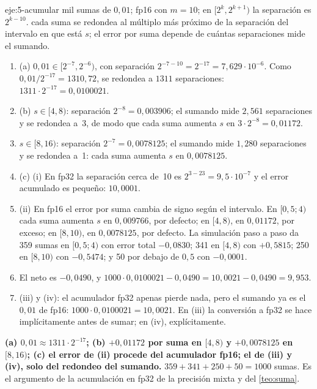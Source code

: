 \begin{solucion}{eje:5-acumular}
\datos mil sumas de $0{,}01$; fp16 con $m=10$; en $[2^{k},2^{k+1})$ la separación es $2^{k-10}$.
\planteamiento cada suma se redondea al múltiplo más próximo de la separación del intervalo en que está $s$; el error por suma depende de cuántas separaciones mide el sumando.
\pasos
\begin{enumerate}[label=\arabic*.]
  \item (a) $0{,}01\in[2^{-7},2^{-6})$, con separación $2^{-7-10}=2^{-17}=7{,}629\cdot 10^{-6}$. Como $0{,}01/2^{-17}=1310{,}72$, se redondea a $1311$ separaciones: $1311\cdot 2^{-17}=0{,}0100021$.
  \item (b) $s\in[4,8)$: separación $2^{-8}=0{,}003906$; el sumando mide $2{,}561$ separaciones y se redondea a~3, de modo que cada suma aumenta $s$ en $3\cdot 2^{-8}=0{,}01172$.
  \item $s\in[8,16)$: separación $2^{-7}=0{,}0078125$; el sumando mide $1{,}280$ separaciones y se redondea a~1: cada suma aumenta $s$ en $0{,}0078125$.
  \item (c) (i) En fp32 la separación cerca de~10 es $2^{3-23}=9{,}5\cdot 10^{-7}$ y el error acumulado es pequeño: $10{,}0001$.
  \item (ii) En fp16 el error por suma cambia de signo según el intervalo. En $[0{,}5;4)$ cada suma aumenta $s$ en $0{,}009766$, por defecto; en $[4,8)$, en $0{,}01172$, por exceso; en $[8,10)$, en $0{,}0078125$, por defecto. La simulación paso a paso da 359 sumas en $[0{,}5;4)$ con error total $-0{,}0830$; 341 en $[4,8)$ con $+0{,}5815$; 250 en $[8,10)$ con $-0{,}5474$; y 50 por debajo de $0{,}5$ con $-0{,}0001$.
  \item El neto es $-0{,}0490$, y $1000\cdot 0{,}0100021-0{,}0490=10{,}0021-0{,}0490=9{,}953$.
  \item (iii) y (iv): el acumulador fp32 apenas pierde nada, pero el sumando ya es el $0{,}01$ de fp16: $1000\cdot 0{,}0100021=10{,}0021$. En (iii) la conversión a fp32 se hace implícitamente antes de sumar; en (iv), explícitamente.
\end{enumerate}
\resultado \textbf{(a) $0{,}01\approx 1311\cdot 2^{-17}$; (b) $+0{,}01172$ por suma en $[4,8)$ y $+0{,}0078125$ en $[8,16)$; (c) el error de (ii) procede del acumulador fp16; el de (iii) y (iv), solo del redondeo del sumando.}
\comprobacion $359+341+250+50=1000$ sumas. Es el argumento de la acumulación en fp32 de la precisión mixta y del \cref{teo:suma}.
\end{solucion}

